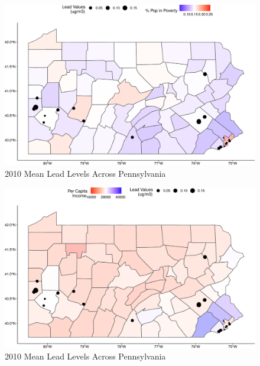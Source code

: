 \documentclass[
  12pt,
]{article}
\begin{document}
\begin{figure}

\includegraphics{Alcorn_Bao_Hermanson_ENV872_Project_files/figure-latex/spatial-analysis 2010-1} \hfill{}

\caption{2010 Mean Lead Levels Across Pennsylvania}\label{fig:spatial-analysis 2010}
\end{figure}

\begin{figure}

\includegraphics{Alcorn_Bao_Hermanson_ENV872_Project_files/figure-latex/spatial analysis 2010.2-1} \hfill{}

\caption{2010 Mean Lead Levels Across Pennsylvania}\label{fig:spatial analysis 2010.2}
\end{figure}
\end{document}
